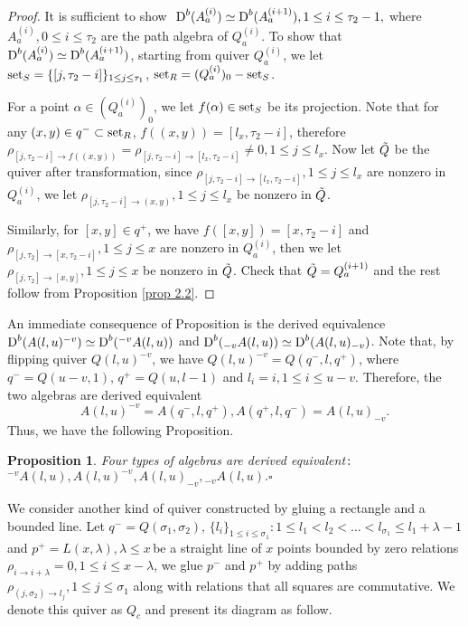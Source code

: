 \documentclass[a4paper, reqno]{amsart}
\newtheorem{prop}[thm]{Proposition}
\theoremstyle{definition}
\theoremstyle{remark}
\numberwithin{equation}{section}
\begin{document}
\begin{proof}
    It is sufficient to show $ \,\,\textup{D}^{b}( A_a^{(i)}) \simeq \textup{D}^{b}(A_a^{(i+1)}), 1\leq i \leq \tau_2 - 1,$  where $ A_a^{(i)}, 0\leq i \leq \tau_2$ are the path algebra of $ Q_a^{(i)} $. To show that $\textup{D}^{b}(A_a^{(i)} )\simeq \textup{D}^{b}(A_a^{(i+1)})$, starting from quiver $ Q_a^{(i)} $, we let $ {\rm{set}}_S = \{[j,\tau_2-i]\}_{1\leq j \leq \tau_1}$, $ {\rm{set}}_R = (Q_a^{(i)})_0-{\rm{set}}_S  $.  
  
  For a point $ \alpha \in (Q_a^{(i)})_0$, we let $f(\alpha) \in {\rm{set}}_S$ be its projection. Note that for any $ (x,y) \in q^{-} \subset {\rm{set}}_R $, $ f\left( (x,y)\right) = [l_x,\tau_2-i]$, therefore $\rho_{[j,\tau_2-i]\to f\left((x,y)\right)} = \rho_{[j,\tau_2-i]\to [l_x,\tau_2-i]}\neq 0, 1 \leq j\leq l_x $. Now let $ \Tilde{Q}$ be the quiver after transformation, since $ \rho_{[j,\tau_2-i]\to [l_x,\tau_2-i]} , 1 \leq j\leq l_x $ are nonzero in $Q_a^{(i)}$, we let $\rho_{[j,\tau_2-i]\to (x,y)}, 1 \leq j\leq l_x $ be nonzero in $ \Tilde{Q}$. 
  
  Similarly, for $ [x,y] \in q^{+}$, we have $f\left( [x,y] \right) = [x,\tau_2-i]$ and $\rho_{[j,\tau_2]\to [x,\tau_2-i]}, 1\leq j \leq x$ are nonzero in $Q_a^{(i)}$, then we let $\rho_{[j,\tau_2]\to [x,y]}, 1\leq j \leq x$ be nonzero in $\Tilde{Q}$. Check that $\Tilde{Q} = {Q}_a^{(i+1)}$ and the rest follow from Proposition \ref{prop 2.2}. 
 
\end{proof}

An immediate consequence of Proposition \label{prop 2.3} is the derived equivalence $\textup{D}^{b}(A(l,u)^{-v} )\simeq \textup{D}^{b}( {^{-v}A(l,u) })$ and $\textup{D}^{b}({ _{-v}A(l,u)} )\simeq \textup{D}^{b}( A(l,u)_{-v} )$. Note that, by flipping quiver $Q(l,u)^{-v}$, we have $ Q(l,u)^{-v} =  Q(q^{-},l,q^{+}) $, where $ q^{-} = Q(u-v,1)$, $q^{+} = Q(u,l-1)$ and $l_i = i, 1\leq i \leq u-v$. Therefore, the two algebras are derived equivalent
$$A(l,u)^{-v} =  A(q^{-},l,q^{+}),  A(q^{+},l,q^{-}) =  A(l,u)_{-v} .$$
Thus, we have the following Proposition. 

\begin{prop}
    Four types of algebras are derived equivalent\,${\rm{:}}$ $ {^{-v}A(l,u) }, A(l,u)^{-v}, A(l,u)_{-v}, { _{-v}A(l,u)}. $\hfill $\square$
\end{prop}

We consider another kind of quiver constructed by gluing a rectangle and a bounded line. Let $q^{-} = Q(\sigma_1,\sigma_2)$, $\{l_i\}_{1\leq i\leq \sigma_1}: 1\leq l_1 < l_2 < \dots < l_{\sigma_1} \leq l_1 + \lambda -1$ and $p^{+} = L(x,\lambda), \lambda \leq x$\,be a straight line of $x$ points bounded by zero relations $\rho_{i\to i+\lambda} = 0, 1\leq i \leq x-\lambda$, we glue $p^{-}$ and $p^{+}$ by adding paths $ \rho_{(j,\sigma_2)\to l_j}, 1 \leq j \leq \sigma_1$ along with relations that all squares are commutative. We denote this quiver as $Q_c$ and present its diagram as follow. \\
\end{document}
